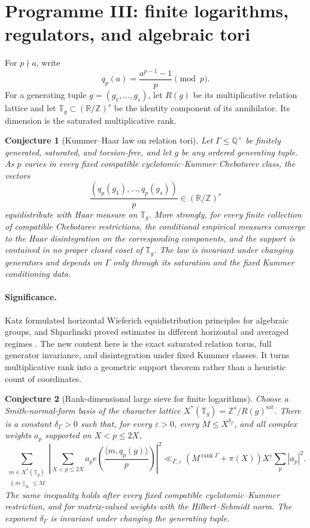 \documentclass[11pt]{article}
\newtheorem{conjecture}{Conjecture}
\newcommand{\rank}{\operatorname{rank}}
\newcommand{\Z}{\mathbb Z}
\newcommand{\Q}{\mathbb Q}
\newcommand{\R}{\mathbb R}
\newcommand{\T}{\mathbb T}
\newcommand{\eps}{\varepsilon}
\begin{document}
\section{Programme III: finite logarithms, regulators, and algebraic tori}

For $p\nmid a$, write
\[
 q_p(a)=\frac{a^{p-1}-1}{p}\pmod p.
\]
For a generating tuple $g=(g_1,\ldots,g_s)$, let $R(g)$ be its multiplicative
relation lattice and let $\T_g\subset(\R/\Z)^s$ be the identity component of its
annihilator.  Its dimension is the saturated multiplicative rank.

\begin{conjecture}[Kummer--Haar law on relation tori]\label{c11}
Let $\Gamma\le\Q^\times$ be finitely generated, saturated, and torsion-free, and let
$g$ be any ordered generating tuple.  As $p$ varies in every fixed compatible
cyclotomic--Kummer Chebotarev class, the vectors
\[
 \frac{(q_p(g_1),\ldots,q_p(g_s))}{p}\in(\R/\Z)^s
\]
equidistribute with Haar measure on $\T_g$.  More strongly, for every finite collection
of compatible Chebotarev restrictions, the conditional empirical measures converge to
the Haar disintegration on the corresponding components, and the support is contained in no
proper closed coset of $\T_g$.  The law is invariant under changing generators and
depends on $\Gamma$ only through its saturation and the fixed Kummer conditioning data.
\end{conjecture}

\paragraph{Significance.}
Katz formulated horizontal Wieferich equidistribution principles for algebraic groups,
and Shparlinski proved estimates in different horizontal and averaged regimes
\cite{Katz,Shparlinski}.  The new content here is the exact saturated relation torus,
full generator invariance, and disintegration under fixed Kummer classes.  It turns
multiplicative rank into a geometric support theorem rather than a heuristic count of
coordinates.

\begin{conjecture}[Rank-dimensional large sieve for finite logarithms]\label{c12}
Choose a Smith-normal-form basis of the character lattice
$X^*(\T_g)=\Z^s/R(g)^{\mathrm{sat}}$.  There is a constant $\delta_\Gamma>0$ such that,
for every $\eps>0$, every $M\le X^{\delta_\Gamma}$, and all complex weights $a_p$
supported on $X<p\le2X$,
\[
 \sum_{\substack{m\in X^*(\T_g)\\\|m\|_\infty\le M}}
 \left|\sum_{X<p\le2X}a_p
 e\!\left(\frac{\langle m,q_p(g)\rangle}{p}\right)\right|^2
 \ll_{\Gamma,\eps}(M^{\rank\Gamma}+\pi(X))X^\eps\sum_p|a_p|^2.
\]
The same inequality holds after every fixed compatible cyclotomic--Kummer restriction,
and for matrix-valued weights with the Hilbert--Schmidt norm.  The exponent
$\delta_\Gamma$ is invariant under changing the generating tuple.
\end{conjecture}
\end{document}
